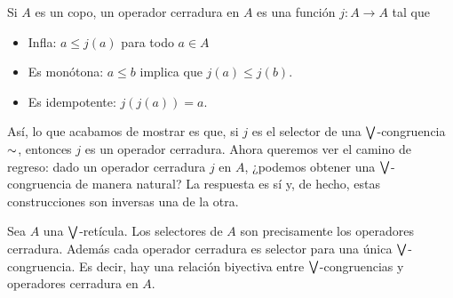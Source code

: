 \begin{definition}
  \label{def:operador-cerradura}
  Si $A$ es un copo, un operador cerradura en $A$ es una función
  $j:A\to A$ tal que
  \begin{itemize}
    \item Infla: $a\leq j(a)$ para todo $a\in A$
    \item Es monótona: $a\leq b$ implica que $j(a)\leq j(b)$.
    \item Es idempotente: $j(j(a))=a$.
  \end{itemize}
\end{definition}
Así, lo que acabamos de mostrar es que, si $j$ es el selector de
una $\bigvee$-congruencia ${\sim}$, entonces $j$ es un operador
cerradura.
Ahora queremos ver el camino de regreso: dado un operador
cerradura $j$ en $A$, ¿podemos obtener una $\bigvee$-congruencia de
manera natural? La respuesta es sí y, de hecho, estas
construcciones son inversas una de la otra.
\begin{lemma}%
  Sea $A$ una $\bigvee$-retícula. Los selectores de $A$ son
  precisamente los operadores cerradura. Además cada operador
  cerradura es selector para una única $\bigvee$-congruencia. Es
  decir, hay una relación biyectiva entre $\bigvee$-congruencias y
  operadores cerradura en $A$.
\end{lemma}
